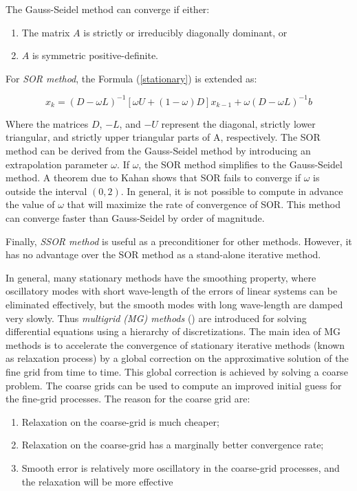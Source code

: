 The Gauss-Seidel method can converge if either:

\begin{enumerate}
	\item The matrix $A$ is strictly or irreducibly diagonally dominant, or
	\item $A$ is symmetric positive-definite.
\end{enumerate}

For \textit{SOR method}, the Formula (\ref{stationary}) is extended as:

\[ x_{k}=(D-\omega L)^{-1}[\omega U+(1-\omega)D]x_{k-1}+\omega(D-\omega L)^{-1}b\]

Where the matrices $D$, $-L$, and $-U$ represent the diagonal, strictly lower triangular, and strictly upper triangular parts of A, respectively. The SOR method can be derived from the Gauss-Seidel method by introducing an extrapolation parameter $\omega$. If $\omega$, the SOR method simplifies to the Gauss-Seidel method. A theorem due to Kahan \cite{kahan1958rate} shows that SOR fails to converge if $\omega$ is outside the interval $(0,2)$. In general, it is not possible to compute in advance the value of $\omega$ that will maximize the rate of convergence of SOR. This method can converge faster than Gauss-Seidel by order of magnitude.

Finally, \textit{SSOR method} is useful as a preconditioner for other methods. However, it has no advantage over the SOR method as a stand-alone iterative method.

In general, many stationary methods have the smoothing property, where oscillatory modes with short wave-length of the errors of linear systems can be eliminated effectively, but the smooth modes with long wave-length are damped very slowly. Thus \textit{multigrid (MG) methods} (\cite{hutchinson1986multigrid, hiptmair1998multigrid, bank1988hierarchical}) are introduced for solving differential equations using a hierarchy of discretizations. The main idea of MG methods is to accelerate the convergence of stationary iterative methods (known as relaxation process) by a global correction on the approximative solution of the fine grid from time to time. This global correction is achieved by solving a coarse problem. The coarse grids can be used to compute an improved initial guess for the fine-grid processes. The reason for the coarse grid are:

\begin{enumerate}
	\item Relaxation on the coarse-grid is much cheaper;
	\item Relaxation on the coarse-grid has a marginally better convergence rate;
	\item Smooth error is relatively more oscillatory in the coarse-grid processes, and the relaxation will be more effective
\end{enumerate}

